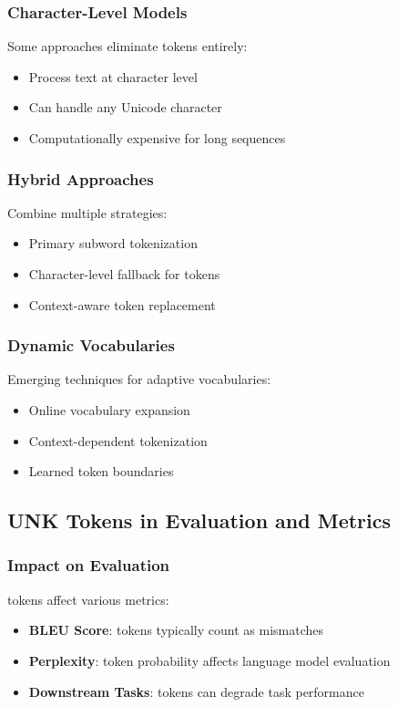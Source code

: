 \subsubsection{Character-Level Models}
Some approaches eliminate \unk{} tokens entirely:
\begin{itemize}
\item Process text at character level
\item Can handle any Unicode character
\item Computationally expensive for long sequences
\end{itemize}

\subsubsection{Hybrid Approaches}
Combine multiple strategies:
\begin{itemize}
\item Primary subword tokenization
\item Character-level fallback for \unk{} tokens
\item Context-aware token replacement
\end{itemize}

\subsubsection{Dynamic Vocabularies}
Emerging techniques for adaptive vocabularies:
\begin{itemize}
\item Online vocabulary expansion
\item Context-dependent tokenization
\item Learned token boundaries
\end{itemize}

\subsection{UNK Tokens in Evaluation and Metrics}

\subsubsection{Impact on Evaluation}
\unk{} tokens affect various metrics:
\begin{itemize}
\item \textbf{BLEU Score}: \unk{} tokens typically count as mismatches
\item \textbf{Perplexity}: \unk{} token probability affects language model evaluation
\item \textbf{Downstream Tasks}: \unk{} tokens can degrade task performance
\end{itemize}

